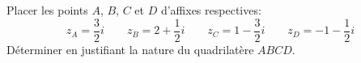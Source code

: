 \begin{exercice}

 Placer les points $A$, $B$, $C$ et $D$ d'affixes respectives:
\[ z_A=\frac32i \qquad z_B=2+\frac12i \qquad z_C=1-\frac32i  \qquad
z_D=-1-\frac12i\]
D\'eterminer en justifiant la nature du quadrilat\`ere $ABCD$.
\end{exercice}
